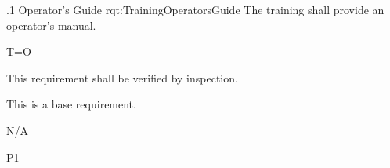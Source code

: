 \ONERQMTV
{\RqtNumberBase.1}
{Operator's Guide}
{rqt:TrainingOperatorsGuide}
{The \ThisSys training shall provide an operator's manual.}
{
	\item [Phase 1] T=O
}
{This requirement shall be verified by inspection.}
{
\item [N/A] This is a base requirement.
}
{
	\item N/A
}
{P1}

